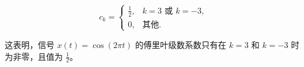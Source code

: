\documentclass[UTF8]{report}
\theoremstyle{MyLineTheoremStyle} %
\theoremstyle{MyBlockTheoremStyle} %
\theoremstyle{MySubsubsectionStyle} %
\begin{document}
\begin{equation}
c_k =
\begin{cases}
\frac{1}{2}, & k = 3 \text{ 或 } k = -3, \\
0, & \text{其他}.
\end{cases}
\end{equation}

这表明，信号 $x(t) = \cos(2\pi t)$ 的傅里叶级数系数只有在 $k = 3$ 和 $k = -3$ 时为非零，且值为 $\frac{1}{2}$。












%






\end{document}

